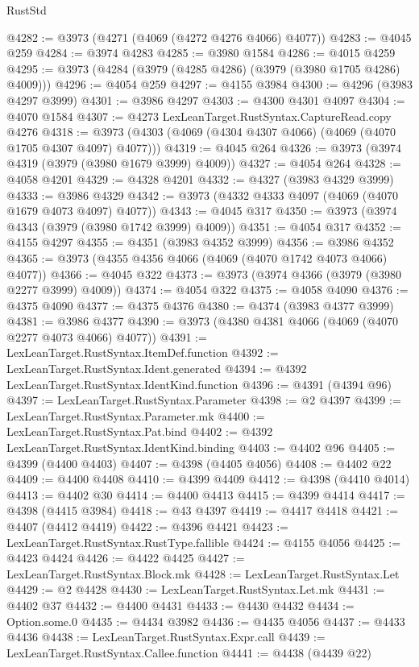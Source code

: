 \begin{lexlean}{RustStd}
\begin{coremodule}
{\begin{coremodule}
{{{{{{{{{{{{{{{{{{{{{{{{{{{{{{{{{{{{{{{{{{{{{{{{{{{{{{{{{{{{{{{{{{{{@4282 := @3973 (@4271 (@4069 (@4272 @4276 @4066) @4077))
@4283 := @4045 @259
@4284 := @3974 @4283
@4285 := @3980 @1584
@4286 := @4015 @4259
@4295 := @3973 (@4284 (@3979 (@4285 @4286) (@3979 (@3980 @1705 @4286) @4009)))
@4296 := @4054 @259
@4297 := @4155 @3984
@4300 := @4296 (@3983 @4297 @3999)
@4301 := @3986 @4297
@4303 := @4300 @4301 @4097
@4304 := @4070 @1584
@4307 := @4273 LexLeanTarget.RustSyntax.CaptureRead.copy @4276
@4318 := @3973 (@4303 (@4069 (@4304 @4307 @4066) (@4069 (@4070 @1705 @4307 @4097) @4077)))
@4319 := @4045 @264
@4326 := @3973 (@3974 @4319 (@3979 (@3980 @1679 @3999) @4009))
@4327 := @4054 @264
@4328 := @4058 @4201
@4329 := @4328 @4201
@4332 := @4327 (@3983 @4329 @3999)
@4333 := @3986 @4329
@4342 := @3973 (@4332 @4333 @4097 (@4069 (@4070 @1679 @4073 @4097) @4077))
@4343 := @4045 @317
@4350 := @3973 (@3974 @4343 (@3979 (@3980 @1742 @3999) @4009))
@4351 := @4054 @317
@4352 := @4155 @4297
@4355 := @4351 (@3983 @4352 @3999)
@4356 := @3986 @4352
@4365 := @3973 (@4355 @4356 @4066 (@4069 (@4070 @1742 @4073 @4066) @4077))
@4366 := @4045 @322
@4373 := @3973 (@3974 @4366 (@3979 (@3980 @2277 @3999) @4009))
@4374 := @4054 @322
@4375 := @4058 @4090
@4376 := @4375 @4090
@4377 := @4375 @4376
@4380 := @4374 (@3983 @4377 @3999)
@4381 := @3986 @4377
@4390 := @3973 (@4380 @4381 @4066 (@4069 (@4070 @2277 @4073 @4066) @4077))
@4391 := LexLeanTarget.RustSyntax.ItemDef.function
@4392 := LexLeanTarget.RustSyntax.Ident.generated
@4394 := @4392 LexLeanTarget.RustSyntax.IdentKind.function
@4396 := @4391 (@4394 @96)
@4397 := LexLeanTarget.RustSyntax.Parameter
@4398 := @2 @4397
@4399 := LexLeanTarget.RustSyntax.Parameter.mk
@4400 := LexLeanTarget.RustSyntax.Pat.bind
@4402 := @4392 LexLeanTarget.RustSyntax.IdentKind.binding
@4403 := @4402 @96
@4405 := @4399 (@4400 @4403)
@4407 := @4398 (@4405 @4056)
@4408 := @4402 @22
@4409 := @4400 @4408
@4410 := @4399 @4409
@4412 := @4398 (@4410 @4014)
@4413 := @4402 @30
@4414 := @4400 @4413
@4415 := @4399 @4414
@4417 := @4398 (@4415 @3984)
@4418 := @43 @4397
@4419 := @4417 @4418
@4421 := @4407 (@4412 @4419)
@4422 := @4396 @4421
@4423 := LexLeanTarget.RustSyntax.RustType.fallible
@4424 := @4155 @4056
@4425 := @4423 @4424
@4426 := @4422 @4425
@4427 := LexLeanTarget.RustSyntax.Block.mk
@4428 := LexLeanTarget.RustSyntax.Let
@4429 := @2 @4428
@4430 := LexLeanTarget.RustSyntax.Let.mk
@4431 := @4402 @37
@4432 := @4400 @4431
@4433 := @4430 @4432
@4434 := Option.some.{0}
@4435 := @4434 @3982
@4436 := @4435 @4056
@4437 := @4433 @4436
@4438 := LexLeanTarget.RustSyntax.Expr.call
@4439 := LexLeanTarget.RustSyntax.Callee.function
@4441 := @4438 (@4439 @22)
}}}}}}}}}}}}}}}}}}}}}}}}}}}}}}}}}}}}}}}}}}}}}}}}}}}}}}}}}}}}}}}}}}}}
\end{coremodule}}
\end{coremodule}
\end{lexlean}
